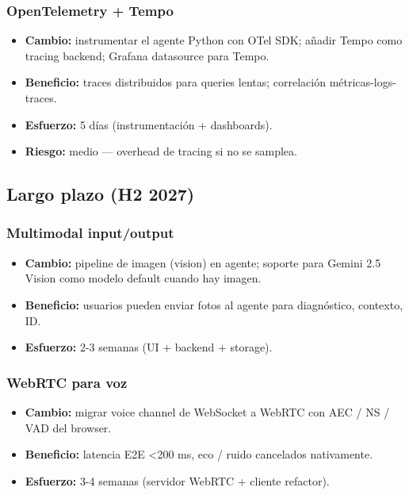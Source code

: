 \documentclass[11pt,a4paper]{article}
\begin{document}
\subsubsection{OpenTelemetry + Tempo}
\begin{itemize}[leftmargin=*,itemsep=1pt]
\item \textbf{Cambio:} instrumentar el agente Python con OTel SDK; añadir Tempo como tracing backend; Grafana datasource para Tempo.
\item \textbf{Beneficio:} traces distribuidos para queries lentas; correlación métricas-logs-traces.
\item \textbf{Esfuerzo:} 5 días (instrumentación + dashboards).
\item \textbf{Riesgo:} medio — overhead de tracing si no se samplea.
\end{itemize}

\subsection{Largo plazo (H2 2027)}

\subsubsection{Multimodal input/output}
\begin{itemize}[leftmargin=*,itemsep=1pt]
\item \textbf{Cambio:} pipeline de imagen (vision) en agente; soporte para Gemini 2.5 Vision como modelo default cuando hay imagen.
\item \textbf{Beneficio:} usuarios pueden enviar fotos al agente para diagnóstico, contexto, ID.
\item \textbf{Esfuerzo:} 2-3 semanas (UI + backend + storage).
\end{itemize}

\subsubsection{WebRTC para voz}
\begin{itemize}[leftmargin=*,itemsep=1pt]
\item \textbf{Cambio:} migrar voice channel de WebSocket a WebRTC con AEC / NS / VAD del browser.
\item \textbf{Beneficio:} latencia E2E \textless 200 ms, eco / ruido cancelados nativamente.
\item \textbf{Esfuerzo:} 3-4 semanas (servidor WebRTC + cliente refactor).
\end{itemize}
\end{document}
